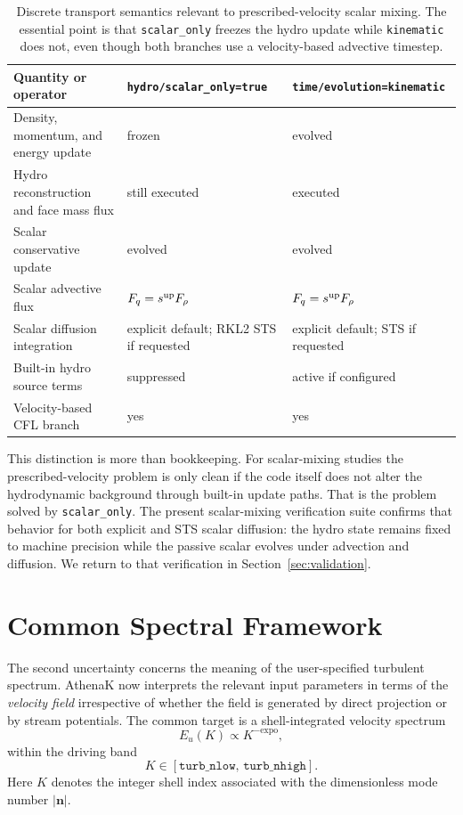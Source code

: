 \documentclass[twocolumn]{aastex7}
\newcommand{\code}[1]{\texttt{#1}}
\newcommand{\SO}{\code{scalar\_only}\xspace}
\newcommand{\kin}{\code{kinematic}\xspace}
\begin{document}
\begin{table}[t]
\centering
\small
\caption{Discrete transport semantics relevant to prescribed-velocity scalar mixing. The essential point is that \SO freezes the hydro update while \kin does not, even though both branches use a velocity-based advective timestep.}
\begin{tabular}{lll}
\hline
Quantity or operator & \code{hydro/scalar\_only=true} & \code{time/evolution=kinematic} \\
\hline
Density, momentum, and energy update & frozen & evolved \\
Hydro reconstruction and face mass flux & still executed & executed \\
Scalar conservative update & evolved & evolved \\
Scalar advective flux & $F_q=s^{\rm up}F_\rho$ & $F_q=s^{\rm up}F_\rho$ \\
Scalar diffusion integration & explicit default; RKL2 STS if requested & explicit default; STS if requested \\
Built-in hydro source terms & suppressed & active if configured \\
Velocity-based CFL branch & yes & yes \\
\hline
\end{tabular}
\label{tab:transport}
\end{table}

This distinction is more than bookkeeping. For scalar-mixing studies the prescribed-velocity problem is only clean if the code itself does not alter the hydrodynamic background through built-in update paths. That is the problem solved by \SO. The present scalar-mixing verification suite confirms that behavior for both explicit and STS scalar diffusion: the hydro state remains fixed to machine precision while the passive scalar evolves under advection and diffusion. We return to that verification in Section~\ref{sec:validation}.

\section{Common Spectral Framework}
\label{sec:spectral-framework}
The second uncertainty concerns the meaning of the user-specified turbulent spectrum. AthenaK now interprets the relevant input parameters in terms of the \emph{velocity field} irrespective of whether the field is generated by direct projection or by stream potentials. The common target is a shell-integrated velocity spectrum
\begin{equation}
E_u(K) \propto K^{-\mathrm{expo}},
\label{eq:target-spectrum}
\end{equation}
within the driving band
\begin{equation}
K \in \left[\code{turb\_nlow},\,\code{turb\_nhigh}\right].
\end{equation}
Here $K$ denotes the integer shell index associated with the dimensionless mode number $|\mathbf{n}|$.
\end{document}
